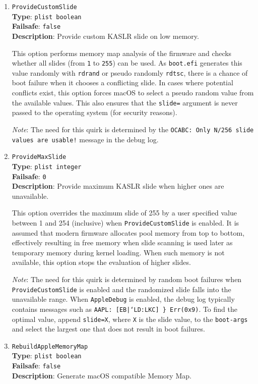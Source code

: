 \documentclass[]{article}
\begin{document}
\begin{enumerate}
\item
  \texttt{ProvideCustomSlide}\\
  \textbf{Type}: \texttt{plist\ boolean}\\
  \textbf{Failsafe}: \texttt{false}\\
  \textbf{Description}: Provide custom KASLR slide on low memory.

  This option performs memory map analysis of the firmware and checks whether
  all slides (from \texttt{1} to \texttt{255}) can be used. As \texttt{boot.efi}
  generates this value randomly with \texttt{rdrand} or pseudo randomly \texttt{rdtsc},
  there is a chance of boot failure when it chooses a conflicting slide. In cases where
  potential conflicts exist, this option forces macOS to select a pseudo random value
  from the available values. This also ensures that the \texttt{slide=} argument is
  never passed to the operating system (for security reasons).

  \emph{Note}: The need for this quirk is determined by the \texttt{OCABC: Only N/256
  slide values are usable!} message in the debug log.

\item
  \texttt{ProvideMaxSlide}\\
  \textbf{Type}: \texttt{plist\ integer}\\
  \textbf{Failsafe}: \texttt{0}\\
  \textbf{Description}: Provide maximum KASLR slide when higher ones are unavailable.

  This option overrides the maximum slide of 255 by a user specified value between 1 and 254
  (inclusive) when \texttt{ProvideCustomSlide} is enabled. It is assumed that modern firmware
  allocates pool memory from top to bottom, effectively resulting in free memory when slide
  scanning is used later as temporary memory during kernel loading. When such memory is not
  available, this option stops the evaluation of higher slides.

  \emph{Note}: The need for this quirk is determined by random boot failures
  when \texttt{ProvideCustomSlide} is enabled and the randomized slide falls
  into the unavailable range. When \texttt{AppleDebug} is enabled, the
  debug log typically contains messages such as \texttt{AAPL: [EB|`LD:LKC] \} Err(0x9)}.
  To find the optimal value, append \texttt{slide=X}, where \texttt{X} is the slide value,
  to the \texttt{boot-args} and select the largest one that does not result in boot failures.

\item
  \texttt{RebuildAppleMemoryMap}\\
  \textbf{Type}: \texttt{plist\ boolean}\\
  \textbf{Failsafe}: \texttt{false}\\
  \textbf{Description}: Generate macOS compatible Memory Map.


\end{enumerate}
\end{document}
